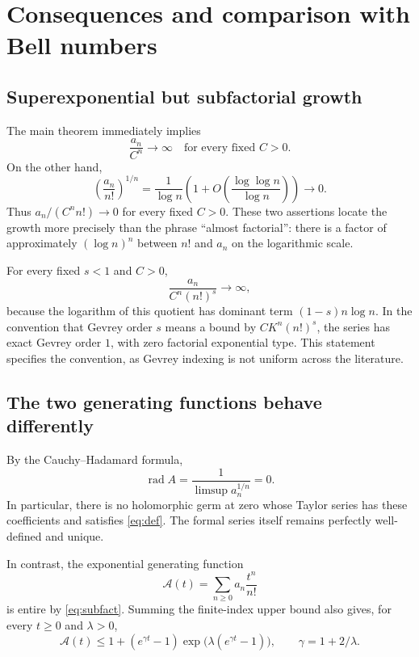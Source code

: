 \documentclass[11pt]{article}
\numberwithin{equation}{section}
\theoremstyle{remark}
\DeclareMathOperator{\rad}{rad}
\begin{document}
\section{Consequences and comparison with Bell numbers}

\subsection{Superexponential but subfactorial growth}

The main theorem immediately implies
\begin{equation}\label{eq:superexp}
 \frac{a_n}{C^n}\longrightarrow\infty
 \quad\text{for every fixed }C>0.
\end{equation}
On the other hand,
\begin{equation}\label{eq:subfact}
 \left(\frac{a_n}{n!}\right)^{1/n}
 =\frac1{\log n}\left(1+O\!\left(\frac{\log\log n}{\log n}\right)\right)
 \longrightarrow0.
\end{equation}
Thus $a_n/(C^n n!)\to0$ for every fixed $C>0$.
These two assertions locate the growth more precisely than the phrase
``almost factorial'': there is a factor of approximately
$(\log n)^n$ between $n!$ and $a_n$ on the logarithmic scale.

For every fixed $s<1$ and $C>0$,
\[
 \frac{a_n}{C^n(n!)^s}\longrightarrow\infty,
\]
because the logarithm of this quotient has dominant term
$(1-s)n\log n$. In the convention that Gevrey order $s$ means a bound
by $CK^n(n!)^s$, the series has exact Gevrey order $1$, with zero
factorial exponential type. This statement specifies the convention,
as Gevrey indexing is not uniform across the literature.

\subsection{The two generating functions behave differently}

By the Cauchy--Hadamard formula,
\[
 \rad A=\frac1{\limsup a_n^{1/n}}=0.
\]
In particular, there is no holomorphic germ at zero whose Taylor series
has these coefficients and satisfies \eqref{eq:def}. The formal series
itself remains perfectly well-defined and unique.

In contrast, the exponential generating function
\begin{equation}\label{eq:EGF}
 \mathcal A(t)=\sum_{n\ge0}a_n\frac{t^n}{n!}
\end{equation}
is entire by \eqref{eq:subfact}. Summing the finite-index upper bound
also gives, for every $t\ge0$ and $\lambda>0$,
\begin{equation}\label{eq:EGFupper}
 \mathcal A(t)\le
 1+(e^{\gamma t}-1)
       \exp\!\bigl(\lambda(e^{\gamma t}-1)\bigr),
 \qquad\gamma=1+2/\lambda.
\end{equation}
\end{document}
